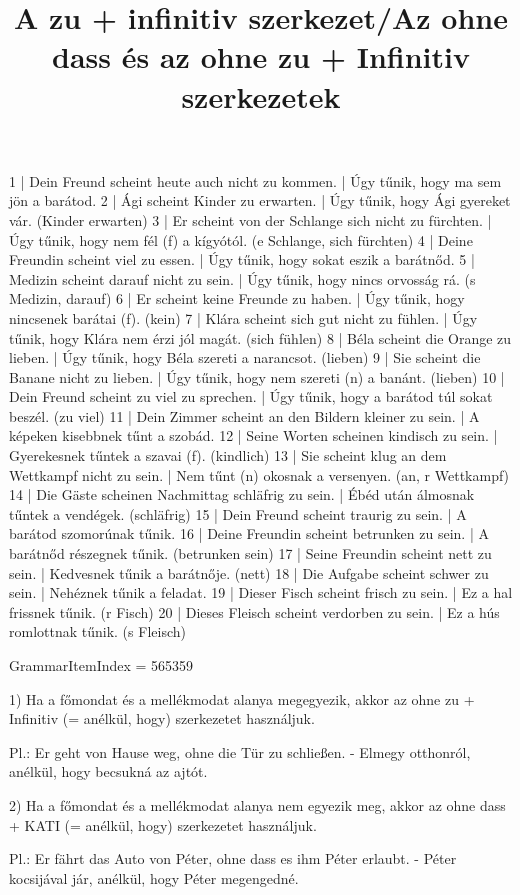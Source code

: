 \begin{exmp}
1 | Dein Freund scheint heute auch nicht zu kommen. | Úgy tűnik, hogy ma sem jön a barátod.
2 | Ági scheint Kinder zu erwarten. | Úgy tűnik, hogy Ági gyereket vár. (Kinder erwarten)
3 | Er scheint von der Schlange sich nicht zu fürchten. | Úgy tűnik, hogy nem fél (f) a kígyótól. (e Schlange, sich fürchten)
4 | Deine Freundin scheint viel zu essen. | Úgy tűnik, hogy sokat eszik a barátnőd.
5 | Medizin scheint darauf nicht zu sein. | Úgy tűnik, hogy nincs orvosság rá. (s Medizin, darauf)
6 | Er scheint keine Freunde zu haben. | Úgy tűnik, hogy nincsenek barátai (f). (kein)
7 | Klára scheint sich gut nicht zu fühlen. | Úgy tűnik, hogy Klára nem érzi jól magát. (sich fühlen)
8 | Béla scheint die Orange zu lieben. | Úgy tűnik, hogy Béla szereti a narancsot. (lieben)
9 | Sie scheint die Banane nicht zu lieben. | Úgy tűnik, hogy nem szereti (n) a banánt. (lieben)
10 | Dein Freund scheint zu viel zu sprechen. | Úgy tűnik, hogy a barátod túl sokat beszél. (zu viel)
11 | Dein Zimmer scheint an den Bildern kleiner zu sein. | A képeken kisebbnek tűnt a szobád.
12 | Seine Worten scheinen kindisch zu sein. | Gyerekesnek tűntek a szavai (f). (kindlich)
13 | Sie scheint klug an dem Wettkampf nicht zu sein. | Nem tűnt (n) okosnak a versenyen. (an, r Wettkampf)
14 | Die Gäste scheinen Nachmittag schläfrig zu sein. | Ébéd után álmosnak tűntek a vendégek. (schläfrig)
15 | Dein Freund scheint traurig zu sein. | A barátod szomorúnak tűnik.
16 | Deine Freundin scheint betrunken zu sein. | A barátnőd részegnek tűnik. (betrunken sein)
17 | Seine Freundin scheint nett zu sein. | Kedvesnek tűnik a barátnője. (nett)
18 | Die Aufgabe scheint schwer zu sein. | Nehéznek tűnik a feladat.
19 | Dieser Fisch scheint frisch zu sein. | Ez a hal frissnek tűnik. (r Fisch)
20 | Dieses Fleisch scheint verdorben zu sein. | Ez a hús romlottnak tűnik. (s Fleisch)
\end{exmp}

\title{A zu + infinitiv szerkezet/Az ohne dass és az ohne zu + Infinitiv szerkezetek}

GrammarItemIndex = 565359

\begin{desc}
1) Ha a főmondat és a mellékmodat alanya megegyezik, akkor az ohne zu + Infinitiv (= anélkül, hogy) szerkezetet használjuk.

Pl.: Er geht von Hause weg, ohne die Tür zu schließen. - Elmegy otthonról, anélkül, hogy becsukná az ajtót.

2) Ha a főmondat és a mellékmodat alanya nem egyezik meg, akkor az ohne dass + KATI (= anélkül, hogy) szerkezetet használjuk.

Pl.: Er fährt das Auto von Péter, ohne dass es ihm Péter erlaubt. - Péter kocsijával jár, anélkül, hogy Péter megengedné.
\end{desc}

